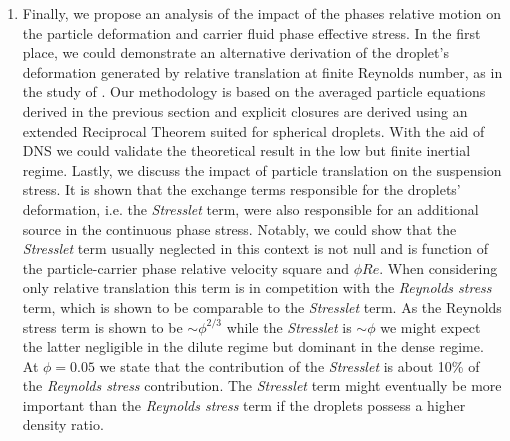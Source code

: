 \begin{enumerate}
\item Finally, we propose an analysis of the impact of the phases relative motion on the particle deformation and carrier fluid phase effective stress. 
In the first place, we could demonstrate an alternative derivation of the droplet's deformation generated by relative translation at finite Reynolds number, as in the study of \citet{taylor1964deformation}. 
Our methodology is based on the averaged particle equations derived in the previous section and explicit closures are derived using an extended Reciprocal Theorem suited for spherical droplets. 
With the aid of DNS we could validate the theoretical result in the low but finite inertial regime. 
Lastly, we discuss the impact of particle translation on the suspension stress. 
It is shown that the exchange terms responsible for the droplets' deformation, i.e. the \textit{Stresslet} term, were also responsible for an additional source in the continuous phase stress. 
Notably, we could show that the \textit{Stresslet} term usually neglected in this context is not null and is function of the particle-carrier phase relative velocity square and $\phi Re$.  
When considering only relative translation this term is in competition with the \textit{Reynolds stress} term, which is shown to be comparable to the \textit{Stresslet} term. 
As the Reynolds stress term is shown to be $\sim \phi^{2/3}$ while the \textit{Stresslet} is $\sim \phi$ we might expect the latter negligible in the dilute regime but dominant in the dense regime. 
At $\phi = 0.05$ we state that the contribution of the \textit{Stresslet} is about 10\% of the \textit{Reynolds stress} contribution. 
The \textit{Stresslet} term might eventually be more important than the \textit{Reynolds stress} term if the droplets possess a higher density ratio. 
\end{enumerate}
